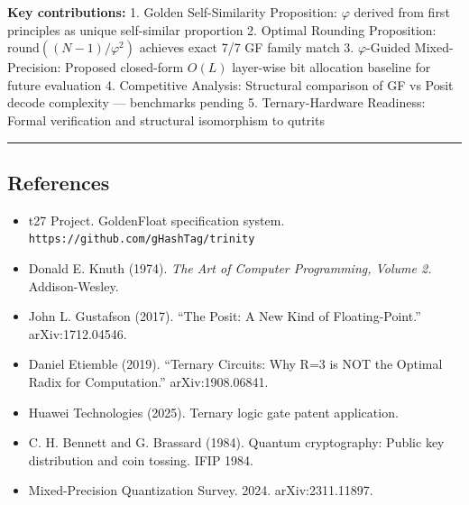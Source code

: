 \textbf{Key contributions:} 1. Golden Self-Similarity Proposition:
\(\varphi\) derived from first principles as unique self-similar
proportion 2. Optimal Rounding Proposition:
\(\text{round}((N-1)/\varphi^2)\) achieves exact 7/7 GF family match 3.
\(\varphi\)-Guided Mixed-Precision: Proposed closed-form \(O(L)\)
layer-wise bit allocation baseline for future evaluation 4. Competitive
Analysis: Structural comparison of GF vs Posit decode complexity ---
benchmarks pending 5. Ternary-Hardware Readiness: Formal verification
and structural isomorphism to qutrits

\begin{center}\rule{0.5\linewidth}{0.5pt}\end{center}

\subsection{References}\label{references}

\begin{itemize}
\tightlist
\item
  t27 Project. GoldenFloat specification system.
  \texttt{https://github.com/gHashTag/trinity}
\item
  Donald E. Knuth (1974). \emph{The Art of Computer Programming, Volume
  2.} Addison-Wesley.
\item
  John L. Gustafson (2017). ``The Posit: A New Kind of Floating-Point.''
  arXiv:1712.04546.
\item
  Daniel Etiemble (2019). ``Ternary Circuits: Why R=3 is NOT the Optimal
  Radix for Computation.'' arXiv:1908.06841.
\item
  Huawei Technologies (2025). Ternary logic gate patent application.
\item
  C. H. Bennett and G. Brassard (1984). Quantum cryptography: Public key
  distribution and coin tossing. IFIP 1984.
\item
  Mixed-Precision Quantization Survey. 2024. arXiv:2311.11897.
\end{itemize}
